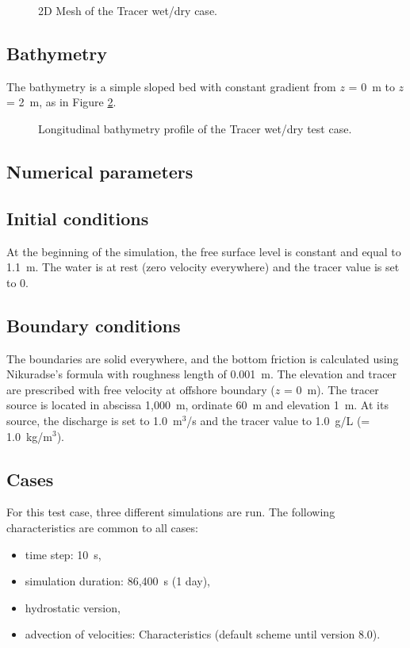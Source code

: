 \begin{figure}[H]
  \centering
  \caption{2D Mesh of the Tracer wet/dry case.}\label{fig:tracerwetdry:Mesh}
\end{figure}

\subsection{Bathymetry}

The bathymetry is a simple sloped bed with constant gradient from $z$ = 0~m to $z$ = 2~m, as in Figure \ref{fig:tracerwetdry:bathy1D}.
\begin{figure}[H]
  \centering
  \caption{Longitudinal bathymetry profile of the Tracer wet/dry test case.}\label{fig:tracerwetdry:bathy1D}
\end{figure}

\subsection{Numerical parameters}

\subsection{Initial conditions}
At the beginning of the simulation, the free surface level is constant and equal to 1.1~m.
The water is at rest (zero velocity everywhere) and the tracer value is set to 0.

\subsection{Boundary conditions}
The boundaries are solid everywhere, and the bottom friction is calculated using Nikuradse's formula
with roughness length of 0.001~m. The elevation and tracer are prescribed with free
velocity at offshore boundary ($z$ = 0~m). The tracer source is located in abscissa 1,000~m,
ordinate 60~m and elevation 1~m. At its source, the discharge is set to 1.0~m$^3$/s
and the tracer value to 1.0~g/L (= 1.0~kg/m$^3$).

\subsection{Cases}

For this test case, three different simulations are run. The following characteristics are common to all cases:\\
\begin{itemize}
\itemsep0em
\item time step: 10~s,
\item simulation duration: 86,400~s (1 day),
\item hydrostatic version,
\item advection of velocities: Characteristics (default scheme until version 8.0).
\end{itemize}

